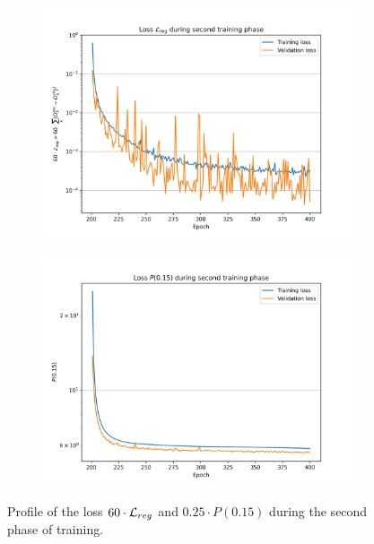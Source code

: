 \documentclass[../main.tex]{subfiles}
\begin{document}
\begin{figure}[ht]
  \centering
  \begin{subfigure}[t]{0.48\linewidth}
    \includegraphics[width=\linewidth]{images/janne/training/phase_2_loss_reg.png}
  \end{subfigure}
  \hfill
  \begin{subfigure}[t]{0.48\linewidth}
    \includegraphics[width=\linewidth]{images/janne/training/phase_2_penal.png}
  \end{subfigure}
  \caption{Profile of the loss $60 \cdot {\cal L}_{reg}$ and $0.25 \cdot P(0.15)$ during the second phase of training.}
  \label{fig:janne:phase_2_2}
\end{figure}
\end{document}
